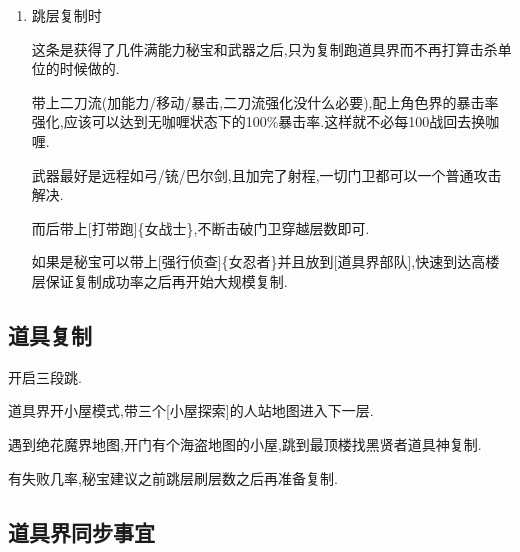 \begin{enumerate}
		所有流派的最终结局

		一切流派在准备好了条件后都不可能超过这个效率.

		复制完十来个秘宝后如果想舒服的走武器道具界都应该朝这个方向进行.

		使用{\color{red}{40-1武器}}作为怒气来源,以彗星奥义为唯一攻击技能.

		准备五个放彗星的人选,每次战斗都恰好有一个人处于复仇状态.

		需要准备5套装备,适用于刷武器刷鞋子时.

		40-1武器流是道具界的最终趋势,有了装备之后都会慢慢过渡到这里.

		走路,完全清屏,进入下一关.

		但是前置条件高,不适用于第一件装备.

		\item
		跳层复制时

		这条是获得了几件满能力秘宝和武器之后,只为复制跑道具界而不再打算击杀单位的时候做的.

		带上二刀流(加能力/移动/暴击,二刀流强化没什么必要),配上角色界的暴击率强化,应该可以达到无咖喱状态下的100\%暴击率.这样就不必每100战回去换咖喱.

		武器最好是远程如弓/铳/巴尔剑,且加完了射程,一切门卫都可以一个普通攻击解决.

		而后带上[打带跑]\{女战士\},不断击破门卫穿越层数即可.

		如果是秘宝可以带上[强行侦查]\{女忍者\}并且放到[道具界部队],快速到达高楼层保证复制成功率之后再开始大规模复制.

	\end{enumerate}

	\newpage

	\subsection{道具复制}

	开启三段跳.

	道具界开小屋模式,带三个[小屋探索]的人站地图进入下一层.

	遇到绝花魔界地图,开门有个海盗地图的小屋,跳到最顶楼找黑贤者道具神复制.

	有失败几率,秘宝建议之前跳层刷层数之后再准备复制.

	\subsection{道具界同步事宜}

